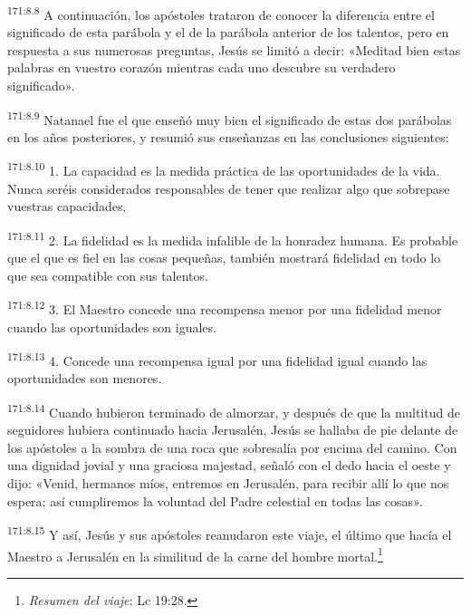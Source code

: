 \par
\textsuperscript{171:8.8} A continuación, los apóstoles trataron de conocer la diferencia entre el significado de esta parábola y el de la parábola anterior de los talentos, pero en respuesta a sus numerosas preguntas, Jesús se limitó a decir: «Meditad bien estas palabras en vuestro corazón mientras cada uno descubre su verdadero significado».

\par
\textsuperscript{171:8.9} Natanael fue el que enseñó muy bien el significado de estas dos parábolas en los años posteriores, y resumió sus enseñanzas en las conclusiones siguientes:

\par
\textsuperscript{171:8.10} 1. La capacidad es la medida práctica de las oportunidades de la vida. Nunca seréis considerados responsables de tener que realizar algo que sobrepase vuestras capacidades.

\par
\textsuperscript{171:8.11} 2. La fidelidad es la medida infalible de la honradez humana. Es probable que el que es fiel en las cosas pequeñas, también mostrará fidelidad en todo lo que sea compatible con sus talentos.

\par
\textsuperscript{171:8.12} 3. El Maestro concede una recompensa menor por una fidelidad menor cuando las oportunidades son iguales.

\par
\textsuperscript{171:8.13} 4. Concede una recompensa igual por una fidelidad igual cuando las oportunidades son menores.

\par
\textsuperscript{171:8.14} Cuando hubieron terminado de almorzar, y después de que la multitud de seguidores hubiera continuado hacia Jerusalén, Jesús se hallaba de pie delante de los apóstoles a la sombra de una roca que sobresalía por encima del camino. Con una dignidad jovial y una graciosa majestad, señaló con el dedo hacia el oeste y dijo: «Venid, hermanos míos, entremos en Jerusalén, para recibir allí lo que nos espera; así cumpliremos la voluntad del Padre celestial en todas las cosas».

\par
\textsuperscript{171:8.15} Y así, Jesús y sus apóstoles reanudaron este viaje, el último que hacía el Maestro a Jerusalén en la similitud de la carne del hombre mortal.\footnote{\textit{Resumen del viaje}: Lc 19:28.}